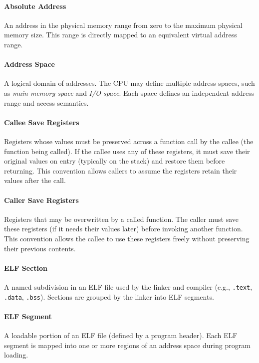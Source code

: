 
\paragraph{Absolute Address}
An address in the physical memory range from zero to the maximum physical memory size. This range is directly mapped to an equivalent virtual address range.

\paragraph{Address Space}
A logical domain of addresses. The CPU may define multiple address spaces, such as \textit{main memory space} and \textit{I/O space}. Each space defines an independent address range and access semantics.

\paragraph{Callee Save Registers}
Registers whose values must be preserved across a function call by the callee (the function being called).  
If the callee uses any of these registers, it must save their original values on entry (typically on the stack) and restore them before returning.  
This convention allows callers to assume the registers retain their values after the call.

\paragraph{Caller Save Registers}
Registers that may be overwritten by a called function.  
The caller must save these registers (if it needs their values later) before invoking another function.  
This convention allows the callee to use these registers freely without preserving their previous contents.

\paragraph{ELF Section}
A named subdivision in an ELF file used by the linker and compiler (e.g., \texttt{.text}, \texttt{.data}, \texttt{.bss}). Sections are grouped by the linker into ELF segments.

\paragraph{ELF Segment}
A loadable portion of an ELF file (defined by a program header). Each ELF segment is mapped into one or more regions of an address space during program loading.

